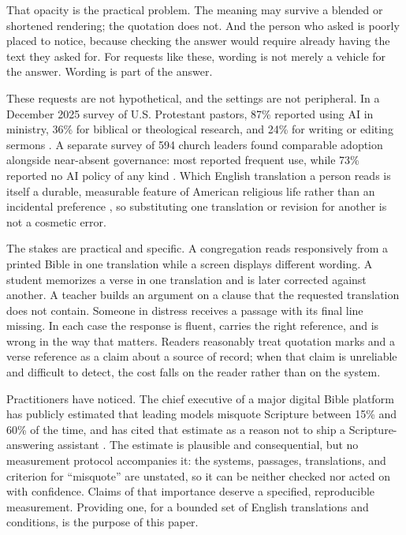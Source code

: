 \documentclass[11pt]{article}
\begin{document}
That opacity is the practical problem. The meaning may survive a blended or
shortened rendering; the quotation does not. And the person who asked is poorly
placed to notice, because checking the answer would require already having the
text they asked for. For requests like these, wording is not merely a vehicle
for the answer. Wording is part of the answer.

These requests are not hypothetical, and the settings are not peripheral. In a
December 2025 survey of U.S. Protestant pastors, 87\% reported using AI in
ministry, 36\% for biblical or theological research, and 24\% for writing or
editing sermons \citep{barna2026pastors}. A separate survey of 594 church
leaders found comparable adoption alongside near-absent governance: most
reported frequent use, while 73\% reported no AI policy of any kind
\citep{exponential2025aichurch}. Which English translation a person reads is
itself a durable, measurable feature of American religious life rather than an
incidental preference \citep{goff2017bible}, so substituting one translation
or revision for another is not a cosmetic error.

The stakes are practical and specific. A congregation reads responsively from a
printed Bible in one translation while a screen displays different wording. A student memorizes
a verse in one translation and is later corrected against another. A teacher
builds an argument on a clause that the requested translation does not contain.
Someone in distress receives a passage with its final line missing. In each case
the response is fluent, carries the right reference, and is wrong in the way
that matters. Readers reasonably treat quotation marks and a verse reference as
a claim about a source of record; when that claim is unreliable and difficult
to detect, the cost falls on the reader rather than on the system.

Practitioners have noticed. The chief executive of a major digital Bible
platform has publicly estimated that leading models misquote Scripture between
15\% and 60\% of the time, and has cited that estimate as a reason not to ship
a Scripture-answering assistant \citep{gruenewald2026misquotes}. The estimate
is plausible and consequential, but no measurement protocol accompanies it: the
systems, passages, translations, and criterion for ``misquote'' are unstated, so it
can be neither checked nor acted on with confidence. Claims of that importance
deserve a specified, reproducible measurement. Providing one, for a bounded set
of English translations and conditions, is the purpose of this paper.
\end{document}

